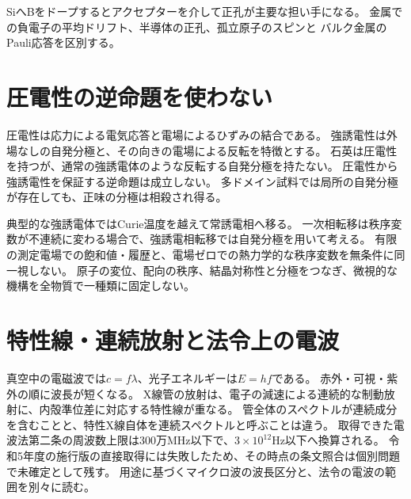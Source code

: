 SiへBをドープするとアクセプターを介して正孔が主要な担い手になる。
金属での負電子の平均ドリフト、半導体の正孔、孤立原子のスピンと
バルク金属のPauli応答を区別する。\cite{mit_semiconductor,em51_pauli}

\section{圧電性の逆命題を使わない}\label{theory:em:ferroelectric}
圧電性は応力による電気応答と電場によるひずみの結合である。
強誘電性は外場なしの自発分極と、その向きの電場による反転を特徴とする。
石英は圧電性を持つが、通常の強誘電体のような反転する自発分極を持たない。
圧電性から強誘電性を保証する逆命題は成立しない。\cite{mit_ferroelectric,em51_quartz}
多ドメイン試料では局所の自発分極が存在しても、正味の分極は相殺され得る。

典型的な強誘電体ではCurie温度を越えて常誘電相へ移る。
一次相転移は秩序変数が不連続に変わる場合で、強誘電相転移では自発分極を用いて考える。
有限の測定電場での飽和値・履歴と、電場ゼロでの熱力学的な秩序変数を無条件に同一視しない。
原子の変位、配向の秩序、結晶対称性と分極をつなぎ、微視的な機構を全物質で一種類に固定しない。\cite{em51_ferro_transition}

\section{特性線・連続放射と法令上の電波}\label{theory:em:spectral}
真空中の電磁波では\(c=f\lambda\)、光子エネルギーは\(E=hf\)である。
赤外・可視・紫外の順に波長が短くなる。
X線管の放射は、電子の減速による連続的な制動放射に、内殻準位差に対応する特性線が重なる。
管全体のスペクトルが連続成分を含むことと、特性X線自体を連続スペクトルと呼ぶことは違う。\cite{em51_xray}
取得できた電波法第二条の周波数上限は300万MHz以下で、\(3\times10^{12}\)Hz以下へ換算される。
令和5年度の施行版の直接取得には失敗したため、その時点の条文照合は個別問題で未確定として残す。
用途に基づくマイクロ波の波長区分と、法令の電波の範囲を別々に読む。\cite{em51_radio_law}
